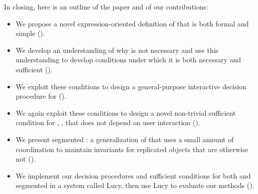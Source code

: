 In closing, here is an outline of the paper and of our contributions:
\begin{itemize}
  \item
    We propose a novel expression-oriented definition of \invariantconfluence{}
    that is both formal and simple ().

  \item
    We develop an understanding of why \invariantclosure{} is not necessary and
    use this understanding to develop conditions under which it is both
    necessary and sufficient ().

  \item
    We exploit these conditions to design a general-purpose interactive
    decision procedure for \invariantconfluence{}
    ().

  \item
    We again exploit these conditions to design a novel non-trivial sufficient
    condition for \invariantconfluence{}, \mergereducibility, that does not
    depend on user interaction ().

  \item
    We present segmented \invariantconfluence{}: a generalization of
    \invariantconfluence{} that uses a small amount of coordination to maintain
    invariants for replicated objects that are otherwise not
    \invariantconfluent{} ().

  \item
    We implement our decision procedures and sufficient conditions for both
    \invariantconfluence{} and segmented \invariantconfluence{} in a system
    called Lucy, then use Lucy to evaluate our methods ().
\end{itemize}
